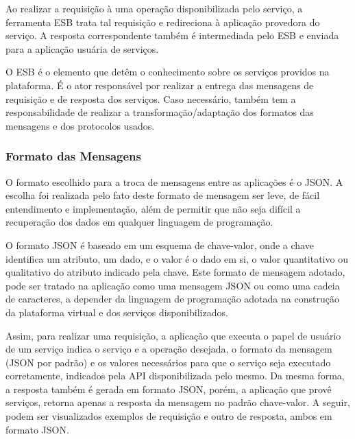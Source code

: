 Ao realizar a requisição à uma operação disponibilizada pelo serviço, a ferramenta ESB trata tal requisição e redireciona à aplicação provedora do serviço. A resposta correspondente também é intermediada pelo ESB e enviada para a aplicação usuária de serviços.

O ESB é o elemento que detêm o conhecimento sobre os serviços providos na plataforma. É o ator responsável por realizar a entrega das mensagens de requisição e de resposta dos serviços. Caso necessário, também tem a  responsabilidade de realizar a transformação/adaptação dos formatos das mensagens e dos protocolos usados.

\subsubsection{Formato das Mensagens}
O formato escolhido para a troca de mensagens entre as aplicações é o JSON. A escolha foi realizada pelo fato deste formato de mensagem ser leve, de fácil entendimento e implementação, além de permitir que não seja difícil a recuperação dos dados em qualquer linguagem de programação.

O formato JSON é baseado em um esquema de chave-valor, onde a chave identifica um atributo, um dado, e o valor é o dado em si, o valor quantitativo ou qualitativo do atributo indicado pela chave. Este formato de mensagem adotado, pode ser tratado na aplicação como uma mensagem JSON ou como uma cadeia de caracteres, a depender da linguagem de programação adotada na construção da plataforma virtual e dos serviços disponibilizados.

Assim, para realizar uma requisição, a aplicação que executa o papel de usuário de um serviço indica o serviço e a operação desejada, o formato da mensagem (JSON por padrão) e os valores necessários para que o serviço seja executado corretamente, indicados pela API disponibilizada pelo mesmo. Da mesma forma, a resposta também é gerada em formato JSON, porém, a aplicação que provê serviços, retorna apenas a resposta da mensagem no padrão chave-valor. A seguir, podem ser visualizados exemplos de requisição e outro de resposta, ambos em formato JSON.


